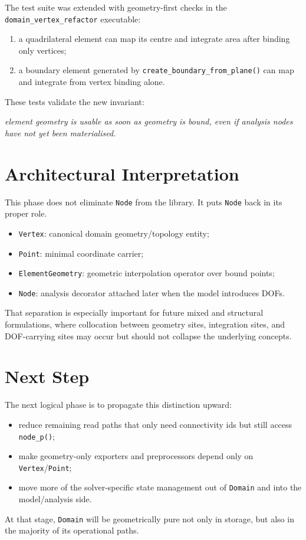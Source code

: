 The test suite was extended with geometry-first checks in the
\texttt{domain\_vertex\_refactor} executable:
\begin{enumerate}[nosep]
  \item a quadrilateral element can map its centre and integrate area after
        binding only vertices;
  \item a boundary element generated by
        \texttt{create\_boundary\_from\_plane()} can map and integrate from
        vertex binding alone.
\end{enumerate}

These tests validate the new invariant:
\begin{center}
\emph{element geometry is usable as soon as geometry is bound, even if analysis
nodes have not yet been materialised.}
\end{center}

\section{Architectural Interpretation}

This phase does not eliminate \texttt{Node} from the library.  It puts
\texttt{Node} back in its proper role.

\begin{itemize}[nosep]
  \item \texttt{Vertex}: canonical domain geometry/topology entity;
  \item \texttt{Point}: minimal coordinate carrier;
  \item \texttt{ElementGeometry}: geometric interpolation operator over bound
        points;
  \item \texttt{Node}: analysis decorator attached later when the model
        introduces DOFs.
\end{itemize}

That separation is especially important for future mixed and structural
formulations, where collocation between geometry sites, integration sites, and
DOF-carrying sites may occur but should not collapse the underlying concepts.

\section{Next Step}

The next logical phase is to propagate this distinction upward:
\begin{itemize}[nosep]
  \item reduce remaining read paths that only need connectivity ids but still
        access \texttt{node\_p()};
  \item make geometry-only exporters and preprocessors depend only on
        \texttt{Vertex}/\texttt{Point};
  \item move more of the solver-specific state management out of
        \texttt{Domain} and into the model/analysis side.
\end{itemize}

At that stage, \texttt{Domain} will be geometrically pure not only in storage,
but also in the majority of its operational paths.
